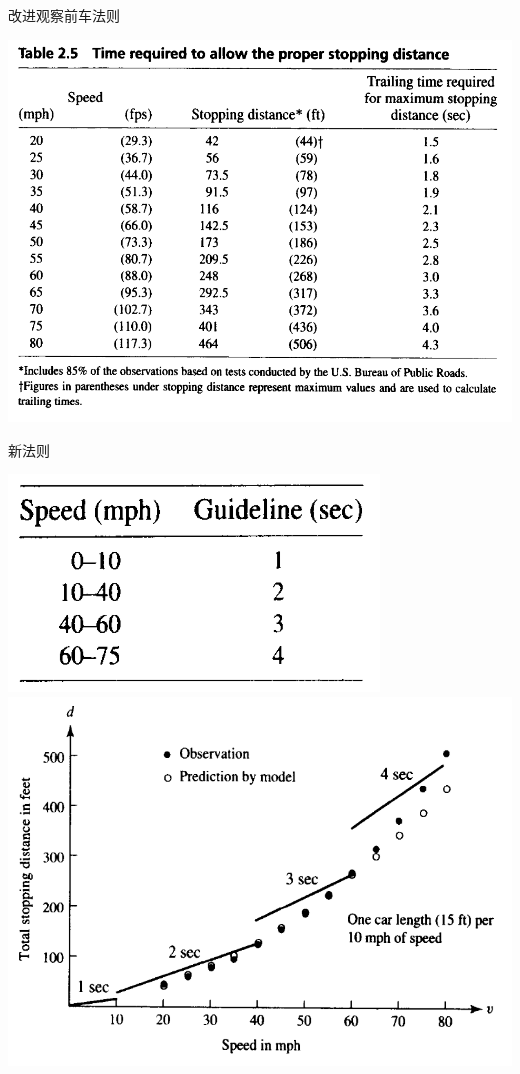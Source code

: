 \documentclass[mathserif]{beamer}
\begin{document}
\begin{frame}{改进观察前车法则}

  \begin{center}
    \includegraphics[width=.8\textwidth{}]{carobserve.png}
  \end{center}
  
\end{frame}

\begin{frame}{新法则}

  \begin{center}
    \includegraphics[width=.2\textwidth{}]{carnewlaw.png}
    \includegraphics[width=.7\textwidth{}]{carfit.png}
  \end{center}
  
\end{frame}
\end{document}
